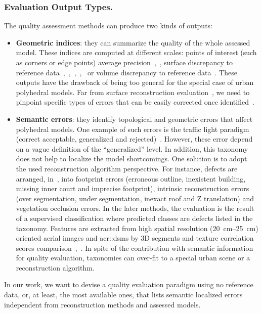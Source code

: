 \documentclass[runningheads]{llncs}
\begin{document}
\subsubsection{Evaluation Output Types.}
The quality assessment methods can produce two kinds of outputs:
\begin{itemize}
    \item \textbf{Geometric indices}: they can summarize the quality of the whole assessed model. These indices are computed at different scales: points of interest (such as corners or edge points) average precision~\cite{Kaartinen2005},~\cite{Voegtle2003}, surface discrepancy to reference data~\cite{Kaartinen2005},~\cite{Henricsson1997},~\cite{Zeng2014},~\cite{Lafarge2012},~\cite{li2016boxfitting} or volume discrepancy to reference data~\cite{Zeng2014}. These outputs have the drawback of being too general for the special case of urban polyhedral models. Far from surface reconstruction evaluation~\cite{berger2013benchmark}, we need to pinpoint specific types of errors that can be easily corrected once identified~\cite{OudeElberink2010}.
    \item \textbf{Semantic errors}: they identify topological and geometric errors that affect polyhedral models. One example of such errors is the traffic light paradigm (correct acceptable, generalized and rejected)~\cite{boudet2006supervised}. However, these error depend on a vague definition of the ``generalized'' level. In addition, this taxonomy does not help to localize the model shortcomings. One solution is to adopt the used reconstruction algorithm perspective. For instance, defects are arranged, in~\cite{Michelin2013}, into footprint errors (erroneous outline, inexistent building, missing inner court and imprecise footprint), intrinsic reconstruction errors (over segmentation, under segmentation, inexact roof and Z translation) and vegetation occlusion errors. In the later methods, the evaluation is the result of a supervised classification where predicted classes are defects listed in the taxonomy. Features are extracted from high spatial resolution (\SIrange{20}{25}{\cm}) oriented aerial images and \glspl{acr::dsm} by 3D segments and texture correlation scores comparison~\cite{boudet2006supervised},~\cite{Michelin2013}. In spite of the contribution with semantic information for quality evaluation, taxonomies can over-fit to a special urban scene or a reconstruction algorithm.
\end{itemize}

In our work, we want to devise a quality evaluation paradigm using no reference data, or, at least, the most available ones, that lists semantic localized errors independent from reconstruction methods and assessed models.
\end{document}

